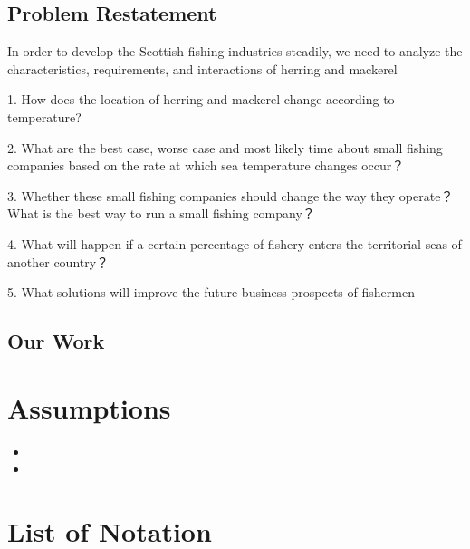 \documentclass{mcmthesis}
\begin{document}
\subsection{Problem Restatement}
In order to develop the Scottish fishing industries steadily,   we need to analyze the characteristics, requirements, and interactions of herring and mackerel

1.    How does the location of herring and mackerel change according to temperature?

2.    What are the best case, worse case and most likely time about  small fishing companies  based on the rate at which sea temperature changes occur？

3.    Whether these small fishing companies should change the way they operate？What is the best way to run a small fishing company？
 
4.    What will happen if a certain percentage of fishery enters the territorial seas of another country？

5.    What solutions will improve the future business prospects of fishermen



\subsection{Our Work}


\section{Assumptions}

\begin{itemize}
\item 
\item 
\end{itemize}

\section{List of Notation}
\end{document}
